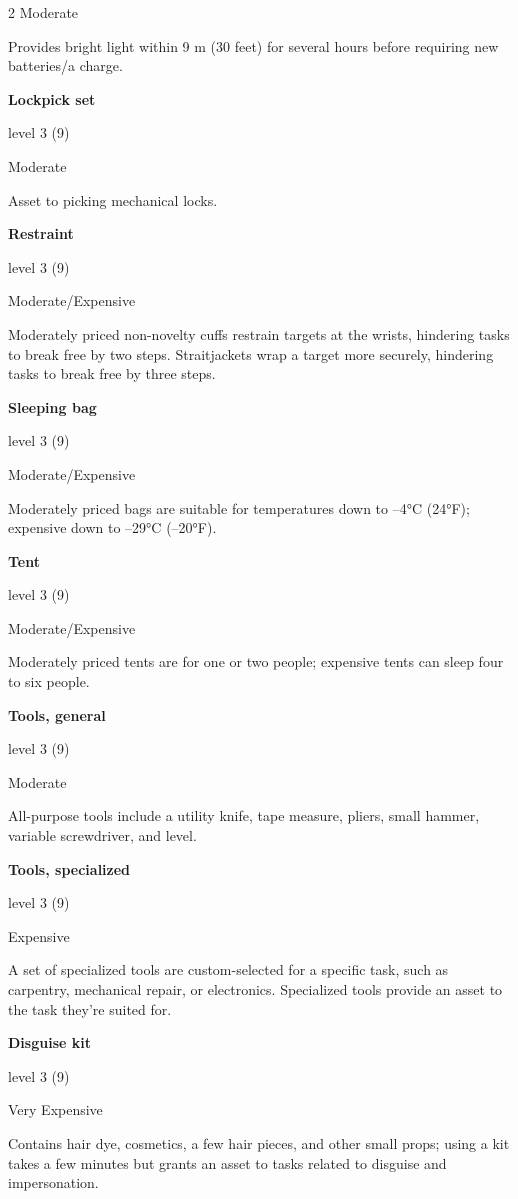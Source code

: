 \begin{multicols}{2}
Moderate

Provides bright light within 9 m (30 feet) for several hours before requiring new batteries/a charge.

\textbf{Lockpick set} 

level 3 (9) 

Moderate

Asset to picking mechanical locks.

\textbf{Restraint} 

level 3 (9) 

Moderate/Expensive 

Moderately priced non-novelty cuffs restrain targets at the wrists, hindering tasks to break free by two steps. Straitjackets wrap a target more securely, hindering tasks to break free by three steps.

\textbf{Sleeping bag} 

level 3 (9) 

Moderate/Expensive 

Moderately priced bags are suitable for temperatures down to –4°C (24°F); expensive down to –29°C (–20°F).

\textbf{Tent} 

level 3 (9) 

Moderate/Expensive 

Moderately priced tents are for one or two people; expensive tents can sleep four to six people.

\textbf{Tools, general} 

level 3 (9) 

Moderate 

All-purpose tools include a utility knife, tape measure, pliers, small hammer, variable screwdriver, and level.

\textbf{Tools, specialized} 

level 3 (9) 

Expensive

A set of specialized tools are custom-selected for a specific task, such as carpentry, mechanical repair, or electronics. Specialized tools provide an asset to the task they’re suited for.

\textbf{Disguise kit} 

level 3 (9) 

Very Expensive

Contains hair dye, cosmetics, a few hair pieces, and other small props; using a kit takes a few minutes but grants an asset to tasks related to disguise and impersonation.


\end{multicols}
